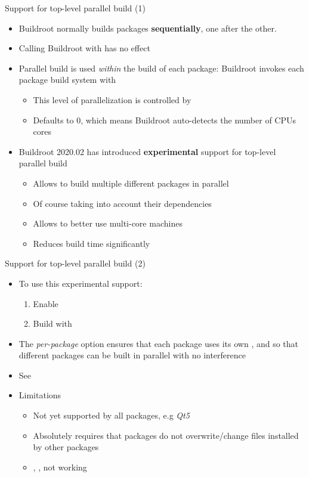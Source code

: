 \begin{frame}{Support for top-level parallel build (1)}
  \begin{itemize}
  \item Buildroot normally builds packages {\bf sequentially}, one after the
    other.
  \item Calling Buildroot with  has no effect
  \item Parallel build is used {\em within} the build of each package:
    Buildroot invokes each package build system with 
    \begin{itemize}
    \item This level of parallelization is controlled by
    \item Defaults to 0, which means Buildroot auto-detects the number
      of CPUs cores
    \end{itemize}
  \item Buildroot 2020.02 has introduced {\bf experimental} support
    for top-level parallel build
    \begin{itemize}
    \item Allows to build multiple different packages in parallel
    \item Of course taking into account their dependencies
    \item Allows to better use multi-core machines
    \item Reduces build time significantly
    \end{itemize}
  \end{itemize}
\end{frame}

\begin{frame}{Support for top-level parallel build (2)}
  \begin{itemize}
  \item To use this experimental support:
    \begin{enumerate}
    \item Enable 
    \item Build with 
    \end{enumerate}
  \item The {\em per-package} option ensures that each package uses
    its own ,  and 
    so that different packages can be built in parallel with no
    interference
  \item See 
  \item Limitations
    \begin{itemize}
    \item Not yet supported by all packages, e.g {\em Qt5}
    \item Absolutely requires that packages do not overwrite/change
      files installed by other packages
    \item {}, ,
       not working
    \end{itemize}
  \end{itemize}
\end{frame}


